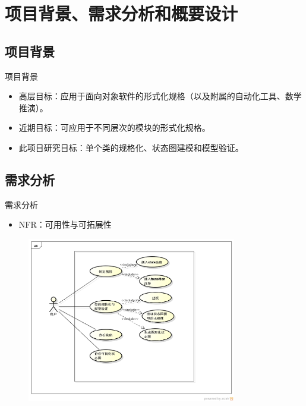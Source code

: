 \documentclass{beamer}
\begin{document}
\section{项目背景、需求分析和概要设计}
\subsection{项目背景}
\begin{frame}{项目背景}
  \begin{itemize}
  \item 高层目标：应用于面向对象软件的形式化规格（以及附属的自动化工具、数学推演）。\pause
  \item 近期目标：可应用于不同层次的模块的形式化规格。\pause
  \item 此项目研究目标：单个类的规格化、状态图建模和模型验证。\pause
  \end{itemize}
\end{frame}
\subsection{需求分析}
\begin{frame}{需求分析}
  \begin{itemize}
  \item NFR：可用性与可拓展性
  \end{itemize}
  \begin{figure}[H]
  \includegraphics[width=3.6in]{img/2.PNG}
  \end{figure}
\end{frame}
\end{document}

